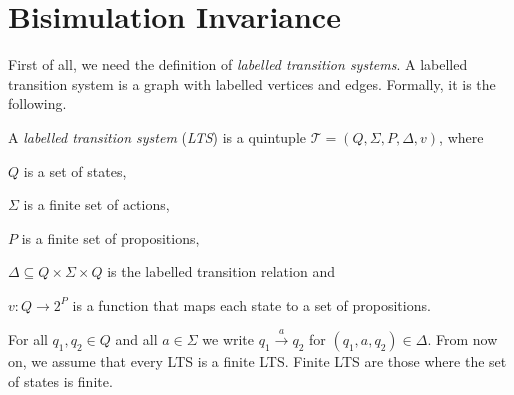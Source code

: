 
\section{Bisimulation Invariance}\label{sec:bisimulationInvariance}

First of all, we need the definition of \textit{labelled transition systems}. A labelled transition system is a graph
with labelled vertices and edges. Formally, it is the following.

\begin{definition}
    \label{definition:lts}
    A \emph{labelled transition system} (\emph{LTS}) is a quintuple $\mathcal{T} = (Q, \Sigma, P, \Delta, v)$,
    where
    \begin{compactitem}
        \item $Q$ is a set of states,
        \item $\Sigma$ is a finite set of actions,
        \item $P$ is a finite set of propositions,
        \item $\Delta \subseteq Q \times \Sigma \times Q$ is the labelled transition relation and
        \item $v: Q \rightarrow 2^P$ is a function that maps each state to a set of propositions.
    \end{compactitem}
\end{definition}

For all $q_1, q_2 \in Q$ and all $a \in \Sigma$ we write $q_1 \overset{a}{\rightarrow} q_2$ for $(q_1, a, q_2) \in
\Delta$. From now on, we assume that every LTS is a finite LTS. Finite LTS are those where the set of states is finite.

